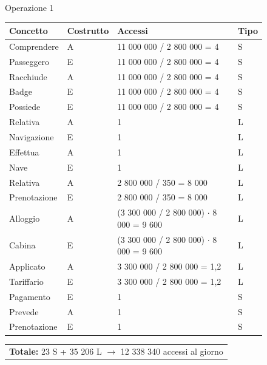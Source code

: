 \documentclass[a4paper, titlepage]{report}
\begin{document}
   \newpage 
 \begin{figure}[h]
		\centering
		Operazione 1\\
		\begin{tabular}{L{3cm}C{2.5cm}C{4.5cm}C{2.5cm}}
			\rule[-2mm]{0mm}{0.65cm}{}
			\textbf{Concetto} & \textbf{Costrutto} &\textbf{Accessi} & \textbf{Tipo} \\
			\hline
			\rule[-2mm]{0mm}{0.65cm}{}
			Comprendere & A & 11 000 000 / 2 800 000 = 4 & S \\
			\hline
			\rule[-2mm]{0mm}{0.65cm}{}
			Passeggero & E & 11 000 000 / 2 800 000 = 4 & S \\
			\hline
			\rule[-2mm]{0mm}{0.65cm}{}
			Racchiude & A & 11 000 000 / 2 800 000 = 4 & S \\
			\hline
			\rule[-2mm]{0mm}{0.65cm}{}
			Badge & E & 11 000 000 / 2 800 000 = 4 & S \\
			\hline
			\rule[-2mm]{0mm}{0.65cm}{}
			Possiede & E & 11 000 000 / 2 800 000 = 4 & S \\
			\hline
			\rule[-2mm]{0mm}{0.65cm}{}
			Relativa & A & 1 & L \\
			\hline
			\rule[-2mm]{0mm}{0.65cm}{}
			Navigazione & E & 1 & L \\
			\hline
			\rule[-2mm]{0mm}{0.65cm}{}
			Effettua & A & 1 & L \\
			\hline
			\rule[-2mm]{0mm}{0.65cm}{}
			Nave & E & 1 & L \\
			\hline
			\rule[-2mm]{0mm}{0.65cm}{}
			Relativa & A & 2 800 000 / 350 = 8 000 & L \\
			\hline
			\rule[-2mm]{0mm}{0.65cm}{}
			Prenotazione & E & 2 800 000 / 350 = 8 000 & L \\
			\hline
			\rule[-2mm]{0mm}{0.65cm}{}
			Alloggio & A & (3 300 000 / 2 800 000) $\cdot$ 8 000 = 9 600 & L \\
			\hline
			\rule[-2mm]{0mm}{0.65cm}{}
			Cabina & E & (3 300 000 / 2 800 000) $\cdot$ 8 000 = 9 600 & L \\
			\hline
			\rule[-2mm]{0mm}{0.65cm}{}
            Applicato & A & 3 300 000 / 2 800 000 = 1,2 & L \\
            \hline
            \rule[-2mm]{0mm}{0.65cm}{}
            Tariffario & E & 3 300 000 / 2 800 000 = 1,2 & L \\
            \hline
            \rule[-2mm]{0mm}{0.65cm}{}
			Pagamento & E & 1 & S \\
			\hline
			\rule[-2mm]{0mm}{0.65cm}{}
			Prevede & A & 1 & S \\
            \hline\rule[-2mm]{0mm}{0.65cm}{}
			Prenotazione & E & 1 & S \\
		\end{tabular}
		\begin{tabular}{C{13.9cm}}
			\rule[-4mm]{0mm}{1cm}{}	
			 \textbf{Totale:} 23 S + 35 206 L $\to$ 12 338 340 accessi al giorno
		\end{tabular}
	\end{figure}
\end{document}
